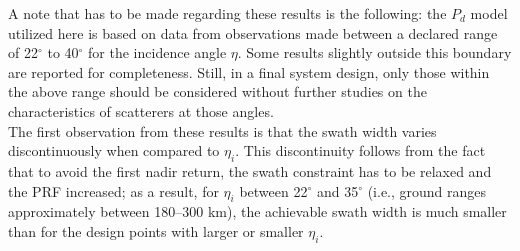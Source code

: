 \documentclass[conference,a4paper]{IEEEtran}
\begin{document}
    \begin{table}[h]
        \caption{Design examples results\\(todo pick 6 or 7 design points)}
        \label{tab:analysis}
        \centering
        \renewcommand{\arraystretch}{-1}
        \large
    \end{table}
    A note that has to be made regarding these results is the following: the $P_d$ model utilized here is based on data from observations made between a declared range of 22$^\circ$ to 40$^\circ$ for the incidence angle $\eta$.
    Some results slightly outside this boundary are reported for completeness.
    Still, in a final system design, only those within the above range should be considered without further studies on the characteristics of scatterers at those angles.\\
    The first observation from these results is that the swath width varies discontinuously when compared to $\eta_i$.
    This discontinuity follows from the fact that to avoid the first nadir return, the swath constraint has to be relaxed and the PRF increased;
    as a result, for $\eta_i$ between 22$^\circ$ and 35$^\circ$ (i.e., ground ranges approximately between 180--300 km), the achievable swath width is much smaller than for the design points with larger or smaller $\eta_i$.
\end{document}
